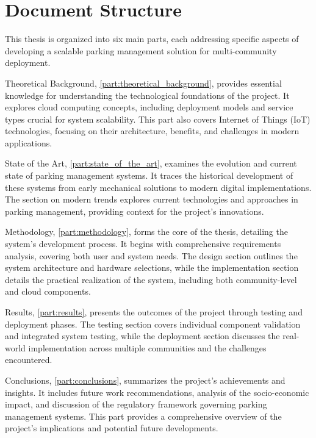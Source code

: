 \chapter{Document Structure}\label{ch:document_structure}

This thesis is organized into six main parts, each addressing specific aspects of developing a scalable parking management solution for multi-community deployment.

Theoretical Background, \cref{part:theoretical_background}, provides essential knowledge for understanding the technological foundations of the project. It explores cloud computing concepts, including deployment models and service types crucial for system scalability. This part also covers Internet of Things (IoT) technologies, focusing on their architecture, benefits, and challenges in modern applications.

State of the Art, \cref{part:state_of_the_art}, examines the evolution and current state of parking management systems. It traces the historical development of these systems from early mechanical solutions to modern digital implementations. The section on modern trends explores current technologies and approaches in parking management, providing context for the project's innovations.

Methodology, \cref{part:methodology}, forms the core of the thesis, detailing the system's development process. It begins with comprehensive requirements analysis, covering both user and system needs. The design section outlines the system architecture and hardware selections, while the implementation section details the practical realization of the system, including both community-level and cloud components.

Results, \cref{part:results}, presents the outcomes of the project through testing and deployment phases. The testing section covers individual component validation and integrated system testing, while the deployment section discusses the real-world implementation across multiple communities and the challenges encountered.

Conclusions, \cref{part:conclusions}, summarizes the project's achievements and insights. It includes future work recommendations, analysis of the socio-economic impact, and discussion of the regulatory framework governing parking management systems. This part provides a comprehensive overview of the project's implications and potential future developments.
